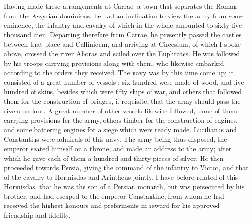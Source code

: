 Having made these arrangements at Carrae, a town that separates the Roman from the Assyrian dominions, he had an inclination to view the army from some eminence, the infantry and cavalry of which in the whole amounted to sixty-five thousand men. Departing therefore from Carrae, he presently passed the castles between that place and Callinicum, and arriving at Circesium, of which I spoke above, crossed the river Aboras and sailed over the Euphrates. He was followed by his troops carrying provisions along with them, who likewise embarked according to the orders they received. The navy was by this time come up; it consisted of a great number of vessels ; six hundred were made of wood, and five hundred of skins, besides which were fifty ships of war, and others that followed them for the construction of bridges, if requisite, that the army should pass the rivers on foot. A great number of other vessels likewise followed, some of them carrying provisions for the army, others timber for the construction of engines, and some battering engines for a siege which were ready made. Lucilianus and Constantius were admirals of this navy. The army being thus disposed, the emperor seated himself on a throne, and made an address to the army; after which he gave each of them a hundred and thirty pieces of silver. He then proceeded towards Persia, giving the command of the infantry to Victor, and that of the cavalry to Hormisdas and Arintheus jointly. I have before related of this Hormisdas, that he was the son of a Persian monarch, but was persecuted by his brother, and had escaped to the emperor Constantine, from whom he had received the highest honours and preferments in reward for his approved friendship and fidelity.

